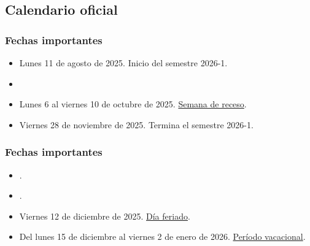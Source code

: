 \documentclass[12pt]{beamer}
\begin{document}
\subsection{Calendario oficial}

\begin{frame}
\frametitle{Fechas importantes}
\begin{itemize}[<+->]
\item Lunes 11 de agosto de 2025. Inicio del semestre 2026-1.
\item {}
\item Lunes 6 al viernes 10 de octubre de 2025. \underline{Semana de receso}.
\item Viernes 28 de noviembre de 2025. Termina el semestre 2026-1.
\end{itemize}
\end{frame}
\begin{frame}
\frametitle{Fechas importantes}
\begin{itemize}[<+->]
\item {}.
\item {}.
\item Viernes 12 de diciembre de 2025. \underline{Día feriado}.
\item Del lunes 15 de diciembre al viernes 2 de enero de 2026. \underline{Período vacacional}.
\end{itemize}
\end{frame}
\end{document}
